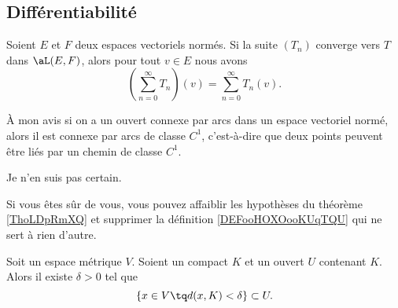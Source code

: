 \subsection{Différentiabilité}

\begin{lemma}       \label{LEMooPIWYooZEofkW}
	Soient \( E\) et \( F\) deux espaces vectoriels normés. Si la suite \( (T_n)\) converge vers \( T\) dans \( \aL(E,F)\), alors pour tout \( v\in E\) nous avons
	\begin{equation}
		\left( \sum_{n=0}^{\infty}T_n \right)(v)=\sum_{n=0}^{\infty}T_n(v).
	\end{equation}
\end{lemma}

\begin{probleme}
	À mon avis si on a un ouvert connexe par arcs dans un espace vectoriel normé, alors il est connexe par arcs de classe \( C^1\), c'est-à-dire que deux points peuvent être liés par un chemin de classe \( C^1\).

	Je n'en suis pas certain.

	Si vous êtes sûr de vous, vous pouvez affaiblir les hypothèses du théorème \ref{ThoLDpRmXQ} et supprimer la définition \ref{DEFooHOXOooKUqTQU} qui ne sert à rien d'autre.
\end{probleme}

\begin{lemma}       \label{LEMooEYARooNExmiw}
    Soit un espace métrique \( V\). Soient un compact \( K\) et un ouvert \( U\) contenant \( K\). Alors il existe \( \delta>0\) tel que
    \begin{equation}
        \{ x\in V\tq d(x,K)<\delta \}\subset U.
    \end{equation}
\end{lemma}

